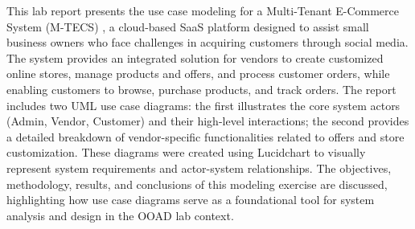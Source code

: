 This lab report presents the use case modeling for a Multi-Tenant E-Commerce System (M-TECS) , a cloud-based SaaS platform designed to assist small business owners who face challenges in acquiring customers through social media. The system provides an integrated solution for vendors to create customized online stores, manage products and offers, and process customer orders, while enabling customers to browse, purchase products, and track orders. The report includes two UML use case diagrams: the first illustrates the core system actors (Admin, Vendor, Customer) and their high-level interactions; the second provides a detailed breakdown of vendor-specific functionalities related to offers and store customization. These diagrams were created using Lucidchart to visually represent system requirements and actor-system relationships. The objectives, methodology, results, and conclusions of this modeling exercise are discussed, highlighting how use case diagrams serve as a foundational tool for system analysis and design in the OOAD lab context.
\endinput
